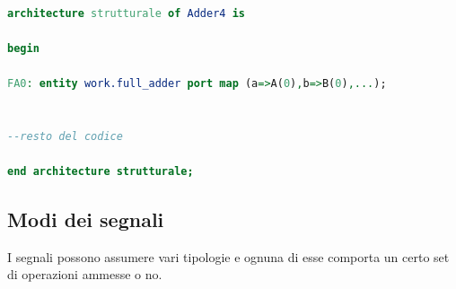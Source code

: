 \documentclass[a4paper]{book}
\begin{document}
\begin{lstlisting}[language=VHDL]

architecture strutturale of Adder4 is

begin

FA0: entity work.full_adder port map (a=>A(0),b=>B(0),...);


--resto del codice

end architecture strutturale;


\end{lstlisting}



\subsection{Modi dei segnali}

I segnali possono assumere vari tipologie e ognuna di esse comporta un certo set di operazioni ammesse o no.
\end{document}

